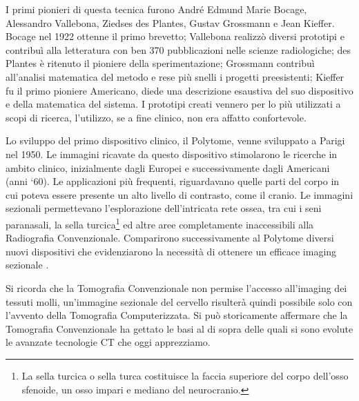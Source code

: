 \documentclass[a4paper,12pt, doubleside]{report}
\begin{document}
                \bigskip
                \par
                    I primi pionieri di questa tecnica furono André Edmund Marie Bocage, Alessandro Vallebona, Ziedses des Plantes, Gustav Grossmann e Jean Kieffer. Bocage nel 1922 ottenne il primo brevetto; Vallebona realizzò diversi prototipi e contribuì alla letteratura con ben 370 pubblicazioni nelle scienze radiologiche\cite{vallebona-ricordo}; des Plantes è ritenuto il pioniere della sperimentazione; Grossmann contribuì all’analisi matematica del metodo e rese più snelli i progetti preesistenti; Kieffer fu il primo pioniere Americano, diede una descrizione esaustiva del suo dispositivo e della matematica del sistema. I prototipi creati vennero per lo più utilizzati a scopi di ricerca, l'utilizzo, se a fine clinico, non era affatto confortevole.
                
                \bigskip
                \par
                    Lo sviluppo del primo dispositivo clinico, il Polytome, venne sviluppato a Parigi nel 1950. Le immagini ricavate da questo dispositivo stimolarono le ricerche in ambito clinico, inizialmente dagli Europei e successivamente dagli Americani (anni ‘60).
                    Le applicazioni più frequenti, riguardavano quelle parti del corpo in cui poteva essere presente un alto livello di contrasto, come il cranio. Le immagini sezionali permettevano l’esplorazione dell’intricata rete ossea, tra cui i seni paranasali, la sella turcica\footnote{La sella turcica o sella turca costituisce la faccia superiore del corpo dell'osso sfenoide, un osso impari e mediano del neurocranio.} ed altre aree completamente inaccessibili alla Radiografia Convenzionale. Comparirono successivamente al Polytome diversi nuovi dispositivi che evidenziarono la necessità di ottenere un efficace imaging sezionale \cite{conventional-tomography}.
                
                \bigskip
                \par
                    Si ricorda che la Tomografia Convenzionale non permise l’accesso all’imaging dei tessuti molli, un’immagine sezionale del cervello risulterà quindi possibile solo con l’avvento della Tomografia Computerizzata. Si può storicamente affermare che la Tomografia Convenzionale ha gettato le basi al di sopra delle quali si sono evolute le avanzate tecnologie CT che oggi apprezziamo.
                        
\end{document}
